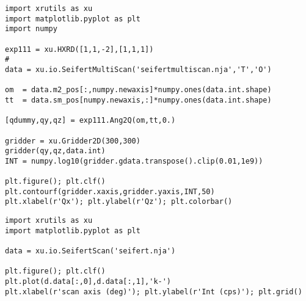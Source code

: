 \begin{lstlisting}[caption=script to parse and plot a reciprocal space map recorded with Seifert's XRD control software]
import xrutils as xu
import matplotlib.pyplot as plt
import numpy

exp111 = xu.HXRD([1,1,-2],[1,1,1])
# 
data = xu.io.SeifertMultiScan('seifertmultiscan.nja','T','O')

om  = data.m2_pos[:,numpy.newaxis]*numpy.ones(data.int.shape)
tt  = data.sm_pos[numpy.newaxis,:]*numpy.ones(data.int.shape)

[qdummy,qy,qz] = exp111.Ang2Q(om,tt,0.)

gridder = xu.Gridder2D(300,300)
gridder(qy,qz,data.int)
INT = numpy.log10(gridder.gdata.transpose().clip(0.01,1e9))

plt.figure(); plt.clf()
plt.contourf(gridder.xaxis,gridder.yaxis,INT,50)
plt.xlabel(r'Qx'); plt.ylabel(r'Qz'); plt.colorbar()
\end{lstlisting}

\begin{lstlisting}[caption=script to parse and plot a single scan recorded with Seifert's XRD control software]
import xrutils as xu
import matplotlib.pyplot as plt

data = xu.io.SeifertScan('seifert.nja')

plt.figure(); plt.clf()
plt.plot(d.data[:,0],d.data[:,1],'k-')
plt.xlabel(r'scan axis (deg)'); plt.ylabel(r'Int (cps)'); plt.grid()
\end{lstlisting}